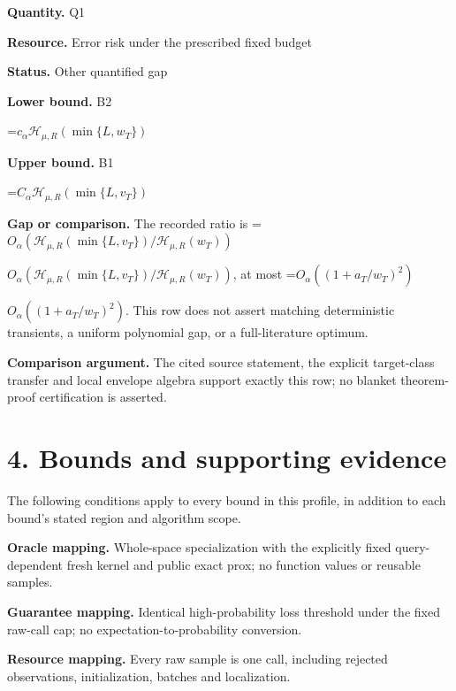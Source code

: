 \documentclass[10pt,a4paper]{article}
\newcommand{\AtlasMath}[1]{\par\begingroup\centering\setbox0=\hbox{$\displaystyle #1$}\ifdim\wd0>1.4\linewidth\typeout{ATLAS WIDE FORMULA: \the\wd0}\fi\ifdim\wd0>\linewidth\resizebox{\linewidth}{!}{\box0}\else\box0\fi\par\endgroup}
\newcommand{\AtlasInlineMath}[1]{\begingroup\setbox0=\hbox{$#1$}\ifdim\wd0>.4\linewidth\endgroup\AtlasMath{#1}\else\endgroup$#1$\fi}
\begin{document}
\textbf{Quantity.} Q1



\textbf{Resource.} Error risk under the prescribed fixed budget



\textbf{Status.} Other quantified gap



\textbf{Lower bound.} B2



\AtlasMath{c_\alpha\mathcal H_{\mu,R}(\min\{L,w_T\})}


\textbf{Upper bound.} B1



\AtlasMath{C_\alpha\mathcal H_{\mu,R}(\min\{L,v_T\})}


\textbf{Gap or comparison.} The recorded ratio is \AtlasInlineMath{O_\alpha(\mathcal H_{\mu,R}(\min\{L,v_T\})/\mathcal H_{\mu,R}(w_T))}, at most \AtlasInlineMath{O_\alpha((1+a_T/w_T)^2)}. This row does not assert matching deterministic transients, a uniform polynomial gap, or a full-literature optimum.



\textbf{Comparison argument.} The cited source statement, the explicit target-class transfer and local envelope algebra support exactly this row; no blanket theorem-proof certification is asserted.



\section{4. Bounds and supporting evidence}


The following conditions apply to every bound in this profile, in addition to each bound's stated region and algorithm scope.



\textbf{Oracle mapping.} Whole-space specialization with the explicitly fixed query-dependent fresh kernel and public exact prox; no function values or reusable samples.



\textbf{Guarantee mapping.} Identical high-probability loss threshold under the fixed raw-call cap; no expectation-to-probability conversion.



\textbf{Resource mapping.} Every raw sample is one call, including rejected observations, initialization, batches and localization.
\end{document}
